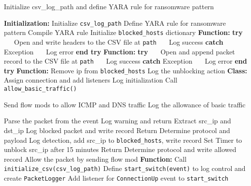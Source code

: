 \documentclass{article}
\begin{document}
\begin{algorithm}
\caption{Initialize csv\_log\_path and define YARA rule for ransomware pattern}
\begin{algorithmic}[1]
\State {}
    \State \textbf{Initialization:}
    \State Initialize \texttt{csv\_log\_path}
    \State Define YARA rule for ransomware pattern
    \State Compile YARA rule
    \State Initialize \texttt{blocked\_hosts} dictionary
\State {}
    \State \textbf{Function:} 
    \State \textbf{try}
    \State \ \ \ Open and write headers to the CSV file at \texttt{path}
    \State \ \ \ Log success
    \State \textbf{catch} Exception
    \State \ \ \ Log error
    \State \textbf{end try}
\State {}
    \State \textbf{Function:}
    \State \textbf{try}
    \State \ \ \ Open and append packet record to the CSV file at \texttt{path}
    \State \ \ \ Log success
    \State \textbf{catch} Exception
    \State \ \ \ Log error
    \State \textbf{end try}
\State {}
    \State \textbf{Function:} 
        \State Remove ip from \texttt{blocked\_hosts}
        \State Log the unblocking action
    \EndIf
\State {}
    \State \textbf{Class:}
        \State Assign connection and add listeners
        \State Log initialization
        \State Call \texttt{allow\_basic\_traffic()}
    \EndProcedure

        \State Send flow mods to allow ICMP and DNS traffic
        \State Log the allowance of basic traffic
    \EndProcedure

        \State Parse the packet from the event
            \State Log warning and return
        \EndIf
            \State Extract src\_ip and dst\_ip
                \State Log blocked packet and write record
                \State Return
            \EndIf
                \State Determine protocol and payload
                    \State Log detection, add src\_ip to \texttt{blocked\_hosts}, write record
                    \State Set Timer to unblock src\_ip after 15 minutes
                    \State Return
                \EndIf
            \EndIf
            \State Determine protocol and write allowed record
            \State Allow the packet by sending flow mod
        \EndIf
    \EndProcedure
\State {}
    \State \textbf{Function:}
    \State Call \texttt{initialize\_csv(csv\_log\_path)}
    \State Define \texttt{start\_switch(event)} to log control and create \texttt{PacketLogger}
    \State Add listener for \texttt{ConnectionUp} event to \texttt{start\_switch}
\end{algorithmic}
\end{algorithm}
\end{document}
